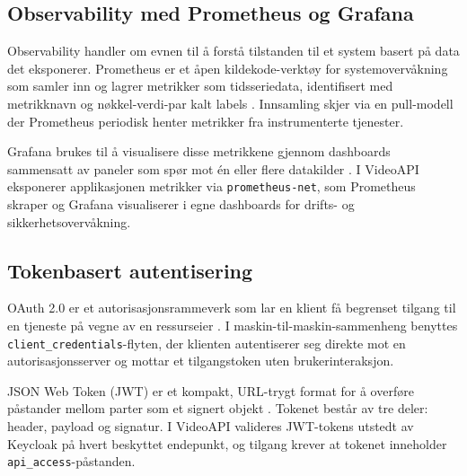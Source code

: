 \subsection{Observability med Prometheus og Grafana}
\label{subsec:observability}

Observability handler om evnen til å forstå tilstanden til et system basert på
data det eksponerer. Prometheus er et åpen kildekode-verktøy for systemovervåkning
som samler inn og lagrer metrikker som tidsseriedata, identifisert med metrikknavn
og nøkkel-verdi-par kalt labels \cite{prometheus_docs}. Innsamling skjer via en
pull-modell der Prometheus periodisk henter metrikker fra instrumenterte tjenester.

Grafana brukes til å visualisere disse metrikkene gjennom dashboards sammensatt av
paneler som spør mot én eller flere datakilder \cite{grafana_docs}. I VideoAPI
eksponerer applikasjonen metrikker via \texttt{prometheus-net}, som Prometheus
skraper og Grafana visualiserer i egne dashboards for drifts- og sikkerhetsovervåkning.

\subsection{Tokenbasert autentisering}
\label{subsec:tokenbasert-autentisering}

OAuth 2.0 er et autorisasjonsrammeverk som lar en klient få begrenset tilgang til
en tjeneste på vegne av en ressurseier \cite{rfc6749}. I maskin-til-maskin-sammenheng
benyttes \texttt{client\_credentials}-flyten, der klienten autentiserer seg direkte
mot en autorisasjonsserver og mottar et tilgangstoken uten brukerinteraksjon.

JSON Web Token (JWT) er et kompakt, URL-trygt format for å overføre påstander mellom
parter som et signert objekt \cite{rfc7519}. Tokenet består av tre deler: header,
payload og signatur. I VideoAPI valideres JWT-tokens utstedt av Keycloak på hvert
beskyttet endepunkt, og tilgang krever at tokenet inneholder \texttt{api\_access}-påstanden.
